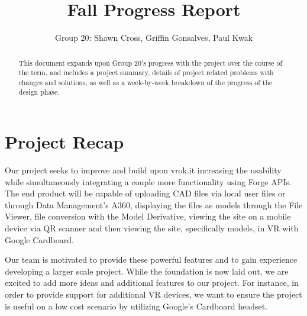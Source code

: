 \documentclass[10pt,draftclsnofoot,onecolumn]{IEEEtran}
\begin{document}
\title{Fall Progress Report}
\author{Group 20: Shawn Cross, Griffin Gonsalves, Paul Kwak}
\maketitle
\hspace*{\fill}\hspace*{\fill}
\vspace{2cm}
\begin{abstract}
This document expands upon Group 20's progress with the project over the course of the term, and includes a project summary, details of project related problems with changes and solutions, as well as a week-by-week breakdown of the progress of the design phase. 
\end{abstract}
\IEEEpeerreviewmaketitle

\newpage
{}

\section{Project Recap}
Our project seeks to improve and build upon vrok.it increasing the usability while simultaneously integrating a couple more functionality using Forge APIs. The end product will be capable of uploading CAD files via local user files or through Data Management’s A360, displaying the files as models through the File Viewer, file conversion with the Model Derivative, viewing the site on a mobile device via QR scanner and then viewing the site, specifically models, in VR with Google Cardboard.

Our team is motivated to provide these powerful features and to gain experience developing a larger scale project. While the foundation is now laid out, we are excited to add more ideas and additional features to our project. For instance, in order to provide support for additional VR devices, we want to ensure the project is useful on a low cost scenario by utilizing Google's Cardboard headset.
\end{document}
